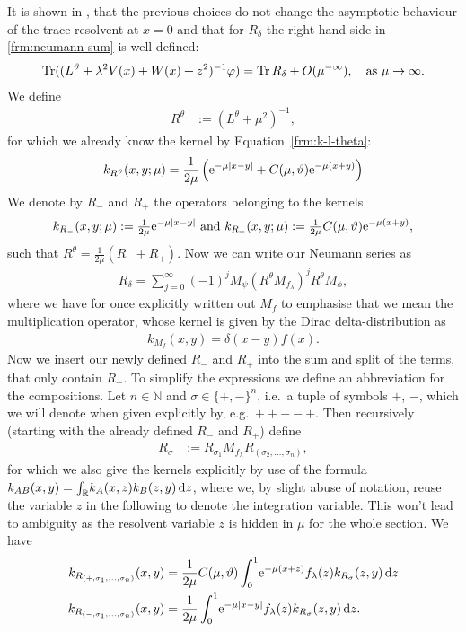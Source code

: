 It is shown in \cite[Sec.2]{LV13}, that the previous choices do not change the
asymptotic behaviour of the trace-resolvent at $x=0$ and that for $R_\delta$ the
right-hand-side in \eqref{frm:neumann-sum} is well-defined:
\begin{align*}
  \Tr((L^\theta + \lambda^2 V(x) + W(x) + z^2)^{-1}\phi) =
  \Tr R_\delta + O(\mu^{-\infty}), \quad \text{as } \mu\to\infty.
\end{align*}
We define
\begin{align}
  \label{frm:r-theta}
  R^\theta &:= (L^\theta + \mu^2)^{-1},
\end{align}
for which we already know the kernel by Equation~\eqref{frm:k-l-theta}:
\begin{align*}
  k_{R^\theta}(x,y;\mu) = \frac1{2\mu} \left( \Eto{-\mu\Abs{x-y}} +
  C(\mu,\theta)\Eto{-\mu(x+y)}\right)
\end{align*}
We denote by $R_-$ and $R_+$ the operators belonging to the kernels
\begin{align*}
  k_{R_-}(x,y;\mu) := \tfrac1{2\mu}\Eto{-\mu\Abs{x-y}} \text{ and }
  k_{R_+}(x,y;\mu) := \tfrac1{2\mu}C(\mu,\theta)\Eto{-\mu(x+y)},
\end{align*}
such that $R^\theta = \tfrac1{2\mu}(R_- + R_+)$. Now we can write our Neumann
series as
\begin{align*}
  R_\delta = \sum_{j=0}^\infty (-1)^j M_\psi\left(R^\theta
  M_{f_\lambda}\right)^j R^\theta M_\phi,
\end{align*}
where we have for once explicitly written out $M_f$ to emphasise that we mean
the multiplication operator, whose kernel is given by the Dirac
delta-distribution as
\begin{align*}
  k_{M_f}(x,y) = \delta(x-y)f(x).
\end{align*}
Now we insert our newly defined $R_-$ and $R_+$ into the sum and split of the
terms, that only contain $R_-$. To simplify the expressions we define an
abbreviation for the compositions. Let $n\in\mathbb{N}$ and $\sigma \in
\{+,-\}^n$, i.e.\ a tuple of symbols $+$, $-$, which we will denote when given
explicitly by, e.g.\ $++--+$. Then recursively (starting with
the already defined $R_-$ and $R_+$) define
\begin{align}
  R_\sigma &:= R_{\sigma_1} M_{f_\lambda}
  R_{(\sigma_2,\ldots,\sigma_{n})},
\end{align}
for which we also give the kernels explicitly by use of the formula $k_{AB}(x,y) =
\Integ{\mathbb{R}}{z}{k_A(x,z)k_B(z,y)}$, where we, by slight abuse of notation,
reuse the variable $z$ in the following to denote the integration variable.
This won't lead to ambiguity as the resolvent variable $z$ is hidden in $\mu$
for the whole section. We have
\begin{align}
  k_{R_{(+,\sigma_1,\ldots,\sigma_n)}}(x,y) &=
  \frac1{2\mu}C(\mu,\theta)\Int{z}{\Eto{-\mu(x+z)}f_\lambda(z)
  k_{R_\sigma}(z,y)} \\
  k_{R_{(-,\sigma_1,\ldots,\sigma_n)}}(x,y) &=
  \frac1{2\mu}\Int{z}{\Eto{-\mu\Abs{x-y}}f_\lambda(z) k_{R_\sigma}(z,y)}.
\end{align}

